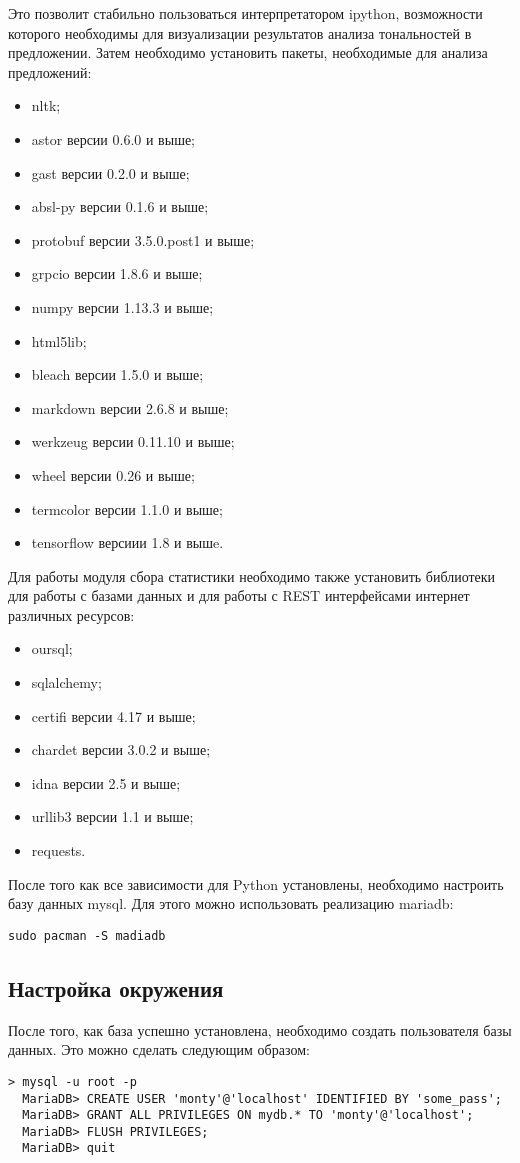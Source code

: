 Это позволит стабильно пользоваться интерпретатором ipython, возможности которого необходимы для визуализации результатов анализа тональностей в предложении. Затем необходимо установить пакеты, необходимые для анализа предложений:
\begin{itemize}
\item nltk;
\item astor версии 0.6.0 и выше;
\item gast версии 0.2.0 и выше;
\item absl-py версии 0.1.6 и выше;
\item protobuf версии 3.5.0.post1 и выше;
\item grpcio версии 1.8.6 и выше;
\item numpy версии 1.13.3 и выше;
\item html5lib;
\item bleach версии 1.5.0 и выше;
\item markdown версии 2.6.8 и выше;
\item werkzeug версии 0.11.10 и выше;
\item wheel версии 0.26 и выше;
\item termcolor версии 1.1.0 и выше;
\item tensorflow версиии 1.8 и вышe.
\end{itemize}

Для работы модуля сбора статистики необходимо также установить библиотеки для работы с базами данных и для работы с REST интерфейсами интернет различных ресурсов:
\begin{itemize}
\item oursql;
\item sqlalchemy;
\item certifi версии 4.17 и выше;
\item chardet версии 3.0.2 и выше;
\item idna версии 2.5 и выше;
\item urllib3 версии 1.1 и выше;
\item requests.
\end{itemize}

После того как все зависимости для Python установлены, необходимо настроить базу данных mysql. Для этого можно использовать реализацию mariadb:
\medskip
\begin{lstlisting}[style=Python]
  sudo pacman -S madiadb
\end{lstlisting}
\medskip

\subsection{Настройка окружения}
После того, как база успешно установлена, необходимо создать пользователя базы данных. Это можно сделать следующим образом:
\medskip
\begin{lstlisting}[style=Python]
  > mysql -u root -p
  MariaDB> CREATE USER 'monty'@'localhost' IDENTIFIED BY 'some_pass';
  MariaDB> GRANT ALL PRIVILEGES ON mydb.* TO 'monty'@'localhost';
  MariaDB> FLUSH PRIVILEGES;
  MariaDB> quit
\end{lstlisting}
\medskip

